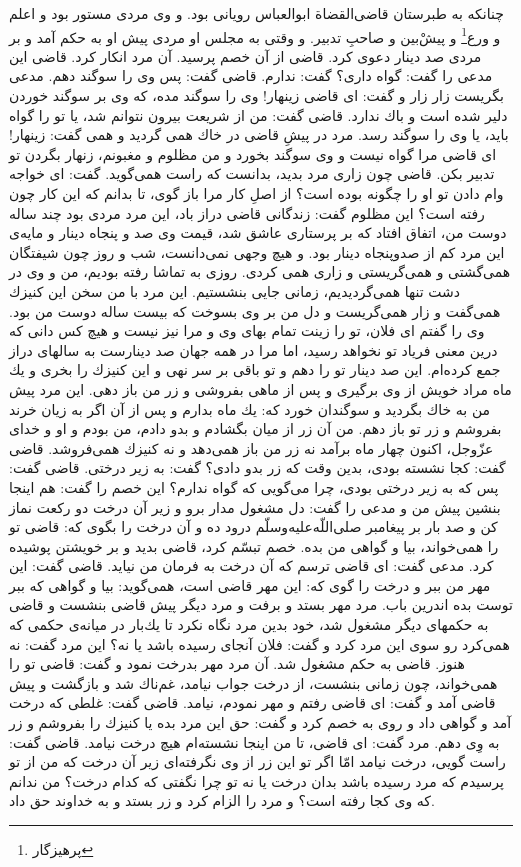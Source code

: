 چنانكه به طبرستان قاضى‌القضاة ابو‌العباس رويانى بود. و وى مردى مستور بود و اعلم و ورع\footnote{پرهیزگار} و پيشْ‌بين و صاحبِ تدبير. و وقتى به مجلس او مردى پيش او به حكم آمد و بر مردى صد دينار دعوى كرد. قاضى از آن خصم پرسيد. آن مرد انكار كرد. قاضى اين مدعى را گفت: گواه دارى‌؟ گفت: ندارم. قاضى گفت: پس وى را سوگند دهم. مدعى بگريست زار زار و گفت: اى قاضى زينهار! وى را سوگند مده، كه وى بر سوگند خوردن دلير شده است و باك ندارد. قاضى گفت: من از شريعت بيرون نتوانم شد، يا تو را گواه بايد، يا وى را سوگند رسد. مرد در پيشِ قاضى در خاك همى گرديد و همى گفت: زينهار! اى قاضى مرا گواه نيست و وى سوگند بخورد و من مظلوم و مغبونم، زنهار بگردن تو تدبير بكن. قاضى چون زارى مرد بديد، بدانست كه راست همى‌گويد. گفت: اى خواجه وام دادن تو او را چگونه بوده است‌؟ از اصلِ كار مرا باز گوى، تا بدانم كه اين كار چون رفته است‌؟ اين مظلوم گفت: زندگانى قاضى دراز باد، اين مرد مردى بود چند ساله دوست من، اتفاق افتاد كه بر پرستارى عاشق شد، قيمت وى صد و پنجاه دينار و مايه‌ی اين مرد كم از صدوپنجاه دينار بود. و هيچ وجهى نمى‌دانست، شب و روز چون شيفتگان همى‌گشتى و همى‌گريستى و زارى همى كردى. روزى به تماشا رفته بوديم، من و وى در دشت تنها همى‌گرديديم، زمانى جايى بنشستيم. اين مرد با من سخن اين كنيزك همى‌گفت و زار همى‌گريست و دل من بر وى بسوخت كه بيست ساله دوست من بود. وى را گفتم اى فلان، تو را زينت تمام بهاى وى و مرا نيز نيست و هيچ كس دانى كه درين معنى فرياد تو نخواهد رسيد، اما مرا در همه جهان صد دينارست به سالهاى دراز جمع كرده‌ام. اين صد دينار تو را دهم و تو باقى بر سر نهى و اين كنيزك را بخرى و يك ماه مراد خويش از وى برگيرى و پس از ماهى بفروشى و زر من باز دهى. اين مرد پيش من به خاك بگرديد و سوگندان خورد كه: يك ماه بدارم و پس از آن اگر به زيان خرند بفروشم و زر تو باز دهم. من آن زر از ميان بگشادم و بدو دادم، من بودم و او و خداى عزّوجل، اكنون چهار ماه برآمد نه زر من باز همى‌دهد و نه كنيزك همى‌فروشد. قاضى گفت: كجا نشسته بودى، بدين وقت كه زر بدو دادى‌؟ گفت: به زير درختى. قاضى گفت: پس كه به زير درختى بودى، چرا مى‌گويى كه گواه ندارم‌؟ اين خصم را گفت: هم اينجا بنشين پيش من و مدعى را گفت: دل مشغول مدار برو و زير آن درخت دو ركعت نماز كن و صد بار بر پيغامبر صلى‌اللّه‌عليه‌و‌سلّم درود ده و آن درخت را بگوى كه: قاضى تو را همى‌خواند، بيا و گواهى من بده. خصم تبسّم كرد، قاضى بديد و بر خويشتن پوشيده كرد. مدعى گفت: اى قاضى ترسم كه آن درخت به فرمان من نيايد. قاضى گفت: اين مهر من ببر و درخت را گوى كه: اين مهر قاضى است، همى‌گويد: بيا و گواهى كه ببر توست بده اندرين باب. مرد مهر بستد و برفت و مرد ديگر پيش قاضى بنشست و قاضى به حكمهاى ديگر مشغول شد، خود بدين مرد نگاه نكرد تا يك‌بار در ميانه‌ی حكمى كه همى‌كرد رو سوى اين مرد كرد و گفت: فلان آنجاى رسيده باشد يا نه‌؟ اين مرد گفت: نه هنوز. قاضى به حكم مشغول شد. آن مرد مهر بدرخت نمود و گفت: قاضى تو را همى‌خواند، چون زمانى بنشست، از درخت جواب نيامد، غم‌ناك شد و بازگشت و پيش قاضى آمد و گفت: اى قاضى رفتم و مهر نمودم، نيامد. قاضى گفت: غلطى كه درخت آمد و گواهى داد و روى به خصم كرد و گفت: حق اين مرد بده يا كنيزك را بفروشم و زر به وِى دهم. مرد گفت: اى قاضى، تا من اينجا نشسته‌ام هيچ درخت نيامد. قاضى گفت: راست گويى، درخت نيامد امّا اگر تو اين زر از وى نگرفته‌اى زير آن درخت كه من از تو پرسيدم كه مرد رسيده باشد بدان درخت يا نه تو چرا نگفتى كه كدام درخت‌؟ من ندانم كه وى كجا رفته است‌؟ و مرد را الزام كرد و زر بستد و به خداوند حق داد.

